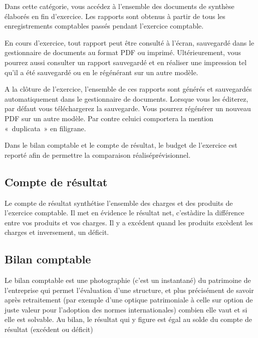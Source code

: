 \documentclass[a4paper,10pt,oneside,french]{sphinxmanual}
\begin{document}
\sphinxAtStartPar
Dans cette catégorie, vous accédez à l’ensemble des documents de synthèse élaborés en fin d’exercice. Les rapports sont obtenus à partir de tous les enregistrements comptables passés pendant l’exercice comptable.

\sphinxAtStartPar
En cours d’exercice, tout rapport peut être consulté à l’écran, sauvegardé dans le gestionnaire de documents au format PDF ou imprimé. Ultérieurement, vous pourrez aussi consulter un rapport sauvegardé et en réaliser une impression tel qu’il a été sauvegardé ou en le régénérant sur un autre modèle.

\sphinxAtStartPar
A la clôture de l’exercice, l’ensemble de ces rapports sont générés et sauvegardés automatiquement dans le gestionnaire de documents. Lorsque vous les éditerez, par défaut vous téléchargerez la sauvegarde. Vous pourrez régénérer un nouveau PDF sur un autre modèle. Par contre celui\sphinxhyphen{}ci comportera la mention « duplicata » en filigrane.

\sphinxAtStartPar
Dans le bilan comptable et le compte de résultat, le budget de l’exercice est reporté afin de permettre la comparaison réalisé\sphinxhyphen{}prévisionnel.


\subsection{Compte de résultat}
\label{\detokenize{accounting/reporting:compte-de-resultat}}
\sphinxAtStartPar
Le compte de résultat  synthétise l’ensemble des charges et des produits de l’exercice comptable.
Il met en évidence le résultat net, c’est\sphinxhyphen{}à\sphinxhyphen{}dire la différence entre vos produits et vos charges. Il y a excédent quand les produits excèdent les charges et inversement, un déficit.


\subsection{Bilan comptable}
\label{\detokenize{accounting/reporting:bilan-comptable}}
\sphinxAtStartPar
Le bilan comptable est une photographie (c’est un instantané) du patrimoine de l’entreprise qui permet l’évaluation d’une structure, et plus précisément de savoir après retraitement (par exemple d’une optique patrimoniale à celle sur option de juste valeur pour l’adoption des normes internationales) combien elle vaut et si elle est solvable.
Au bilan, le résultat qui y figure est égal au solde du compte de résultat (excédent ou déficit)
\end{document}
